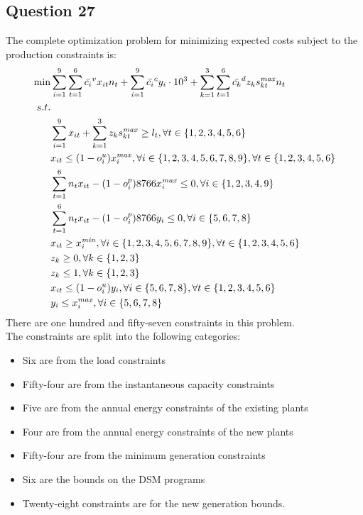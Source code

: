 \documentclass[11pt,a4paper]{article}
\begin{document}
\subsection*{Question 27}
The complete optimization problem for minimizing expected costs subject to the production constraints is:
\begin{align*}
	\min & \sum_{i=1}^{9}\sum_{t=1}^{6} \bar{c_{i}}^{v}x_{it}n_{t} + \sum_{i=1}^{9}\bar{c_{i}}^{c}y_{i}\cdot 10^3 + \sum_{k=1}^{3}\sum_{t=1}^{6}\bar{c_{k}}^{d}z_{k}s_{kt} ^{\text{\textit{max}}}n_{t}\\
	s.t. & \\
	& \sum_{i=1}^{9}x_{it} + \sum_{k=1}^{3}z_{k}s_{kt}^{\text{\textit{max}}}\geq l_{t},   \forall t\in{}\{1,2,3,4,5,6\}\\
	& x_{it} \leq (1 - o_{i}^{u})x_{i}^{\text{\textit{max}}},	\forall i \in{} \{1,2,3,4,5,6,7,8,9\}, \forall t\in{}\{1,2,3,4,5,6\}\\
	& \sum_{t=1}^{6}n_{t}x_{it} - (1 - o_{i}^{p})8766x_{i}^{\text{\textit{max}}} \leq 0, \forall i \in{} \{1,2,3,4,9\}\\
	& \sum_{t=1}^{6}n_{t}x_{it} - (1 - o_{i}^{p})8766y_{i} \leq 0, \forall i \in{} \{5,6,7,8\}\\
	& x_{it} \geq x_{i}^{\text{\textit{min}}},	\forall i \in{} \{1,2,3,4,5,6,7,8,9\}, \forall t\in{}\{1,2,3,4,5,6\}\\
	& z_{k} \geq 0, \forall k \in{} \{1,2,3\}\\
	& z_{k} \leq 1, \forall k \in{} \{1,2,3\}\\
	& x_{it} \leq (1 - o_{i}^{u})y_{i},	\forall i \in{} \{5,6,7,8\}, \forall t\in{}\{1,2,3,4,5,6\}\\
	& y_{i} \leq x_{i}^{\text{\textit{max}}}, \forall i \in{} \{5,6,7,8\}\\
\end{align*}
There are one hundred and fifty-seven constraints in this problem.\\
The constraints are split into the following categories:
\begin{itemize}
	\item Six are from the load constraints
	\item Fifty-four are from the instantaneous capacity constraints
	\item Five are from the annual energy constraints of the existing plants
	\item Four are from the annual energy constraints of the new plants
	\item Fifty-four are from the minimum generation constraints
	\item Six are the bounds on the DSM programs
	\item Twenty-eight constraints are for the new generation bounds.
\end{itemize}
\end{document}
